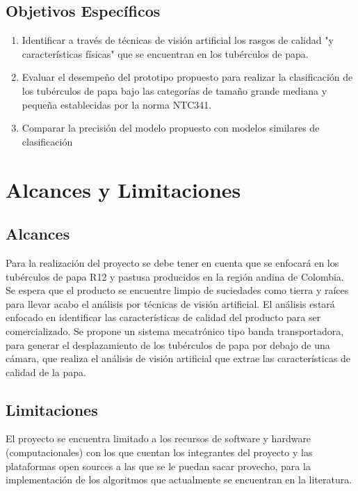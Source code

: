 \subsection{Objetivos Específicos}
\begin{enumerate}
	\item Identificar a través de técnicas de visión artificial los rasgos de calidad "y características físicas" que se encuentran en los tubérculos de papa. 
	\item Evaluar el desempeño del prototipo propuesto para realizar la clasificación de los tubérculos de papa bajo las categorías de tamaño grande mediana y pequeña establecidas por la norma NTC341. 
	\item Comparar la precisión del modelo propuesto con modelos similares de clasificación
\end{enumerate}

\section{Alcances y Limitaciones}

\subsection{Alcances}

Para la realización del proyecto se debe tener en cuenta que se enfocará en los tubérculos de papa R12 y pastusa producidos en la región andina de Colombia. Se espera que el producto se encuentre limpio de suciedades como tierra y raíces para llevar acabo el análisis por técnicas de visión artificial. El análisis estará enfocado en identificar las características de calidad del producto para ser comercializado. Se propone un sistema mecatrónico tipo banda transportadora, para generar el desplazamiento de los tubérculos de papa por debajo de una cámara, que realiza el análisis de visión artificial que extrae las características de calidad de la papa.  

\subsection{Limitaciones}


El proyecto se encuentra limitado a los recursos de software y hardware (computacionales) con los que cuentan los integrantes del proyecto y las plataformas open sources a las que se le puedan sacar provecho, para la implementación de los algoritmos que actualmente se encuentran en la literatura.

